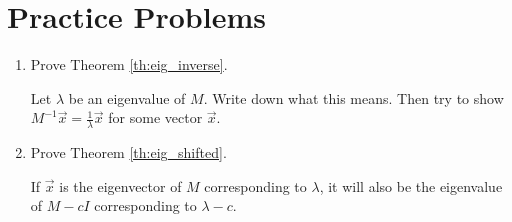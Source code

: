 \documentclass{ximera}
\begin{document}
\section*{Practice Problems}

\begin{problem}\label{prob:complete_eig_proofs}

\begin{enumerate}
    \item Prove Theorem \ref{th:eig_inverse}.
    \begin{hint}
    Let $\lambda$ be an eigenvalue of $M$.  Write down what this means.  Then try to show $M^{-1}\vec{x} = \frac{1}{\lambda}\vec{x}$ for some vector $\vec{x}$.
    \end{hint}
    
    \item Prove Theorem \ref{th:eig_shifted}.
    \begin{hint}
    If $\vec{x}$ is the eigenvector of $M$ corresponding to $\lambda$, it will also be the eigenvalue of $M-cI$ corresponding to $\lambda - c$. 
    \end{hint}
\end{enumerate}

\end{problem}
\end{document}
